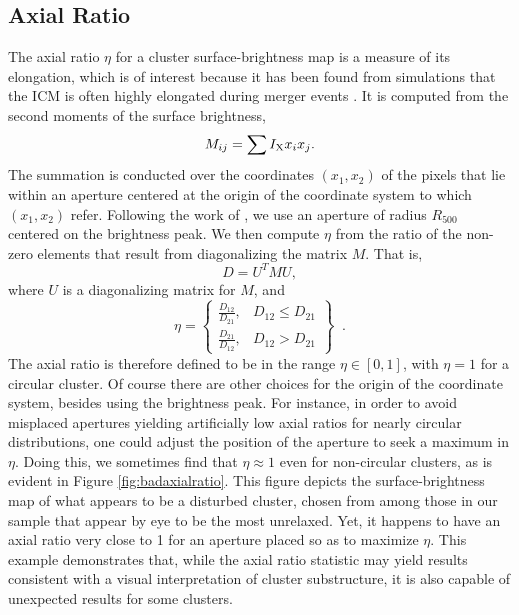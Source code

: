 \documentclass{aastex} \usepackage{natbib}
\begin{document}
\subsection{Axial Ratio}
The axial ratio $\eta$ for a cluster surface-brightness map is a
measure of its elongation, which is of interest because it has been
found from simulations that the ICM is often highly elongated during
merger events \citep{1993ApJ...419L...9E,1994MNRAS.268..953P}.  It is
computed from the second moments of the surface brightness,
\begin{equation}
  \label{eq:aratio_moments}
  M_{ij}=\sum I_{\rm X} x_i x_j.
\end{equation}
The summation is conducted over the coordinates $(x_1, x_2)$ of the
pixels that lie within an aperture centered at the origin of the
coordinate system to which $(x_1, x_2)$ refer.  Following the work of
\cite{2006ApJ...639...64O}, we use an aperture of radius $R_{500}$
centered on the brightness peak.  We then compute $\eta$ from the
ratio of the non-zero elements that result from diagonalizing the
matrix $M$.  That is,
\begin{equation}
  \label{eq:diagonalize}
  D = U^T M U,
\end{equation}
where $U$ is a diagonalizing matrix for $M$, and  
\begin{equation}
  \label{eq:aratio}
  \eta = 
  \left\{ 
    \begin{array}{ll}
      \frac{D_{12}}{D_{21}}, & D_{12} \le D_{21} \\
      \frac{D_{21}}{D_{12}}, & D_{12} > D_{21}
    \end{array}
  \right\} \; \; .
\end{equation}
The axial ratio is therefore defined to be in the range $\eta \in [0,
1]$, with $\eta = 1$ for a circular cluster.  Of course there are
other choices for the origin of the coordinate system, besides using
the brightness peak.  For instance, in order to avoid misplaced
apertures yielding artificially low axial ratios for nearly circular
distributions, one could adjust the position of the aperture to seek a
maximum in $\eta$.  Doing this, we sometimes find that $\eta \approx
1$ even for non-circular clusters, as is evident in Figure
\ref{fig:badaxialratio}.  This figure depicts the surface-brightness
map of what appears to be a disturbed cluster, chosen from among those
in our sample that appear by eye to be the most unrelaxed. Yet, it
happens to have an axial ratio very close to 1 for an aperture placed
so as to maximize $\eta$.  This example demonstrates that, while the
axial ratio statistic may yield results consistent with a visual
interpretation of cluster substructure, it is also capable of
unexpected results for some clusters.
\end{document}
